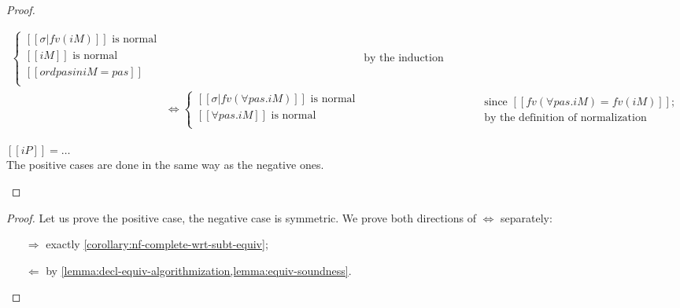 \begin{proof}
\begin{caseof}
\begin{align*}
                                             \begin{cases}
                                               [[ σ|fv(iM) ]] \text{ is normal} \\
                                               [[ iM ]] \text{ is normal} \\
                                               [[ord {pas} in iM = pas]] \\
                                             \end{cases}
                                           && \text{by the induction hypothesis}\\
                                           &\iff
                                             \begin{cases}
                                               [[ σ|fv(∀pas.iM) ]] \text{ is normal} \\
                                               [[ ∀pas.iM ]] \text{ is normal} \\
                                             \end{cases}
                                           &&
                                              \begin{aligned}
                                              &\text{since $[[fv(∀pas.iM) = fv(iM)]]$;}\\ &\text{by the definition of normalization}
                                              \end{aligned}
    \end{align*}
  \item $[[iP]] = \dots$\\
    The positive cases are done in the same way as the negative ones.

  \end{caseof}
\end{proof}

\lemmaSubtInducedEquivAlg*
\begin{proof}
  Let us prove the positive case, the negative case is symmetric.
  We prove both directions of $\iff$ separately:
  \begin{itemize}
    \item [$\Rightarrow$] exactly \cref{corollary:nf-complete-wrt-subt-equiv};
    \item [$\Leftarrow$] by \cref{lemma:decl-equiv-algorithmization,lemma:equiv-soundness}.
  \end{itemize}
\end{proof}


